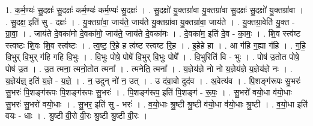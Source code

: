 \documentclass[17pt]{extarticle}
\begin{document}
1. क॒र्म॒ण्यः॑ सु॒दक्षः॑ सु॒दक्षः॑ कर्म॒ण्यः॑ कर्म॒ण्यः॑ सु॒दक्षः॑ । . सु॒दक्षो॑ यु॒क्तग्रा॑वा यु॒क्तग्रा॑वा सु॒दक्षः॑ सु॒दक्षो॑ यु॒क्तग्रा॑वा । . सु॒दक्ष॒ इति॑ सु - दक्षः॑ । . यु॒क्तग्रा॑वा॒ जाय॑ते॒ जाय॑ते यु॒क्तग्रा॑वा यु॒क्तग्रा॑वा॒ जाय॑ते । . यु॒क्तग्रा॒वेति॑ यु॒क्त - ग्रा॒वा॒ । . जाय॑ते दे॒वका॑मो दे॒वका॑मो॒ जाय॑ते॒ जाय॑ते दे॒वका॑मः । . दे॒वका॑म॒ इति॑ दे॒व - का॒मः॒ । . शि॒व स्त्व॑ष्ट स्त्वष्टः शि॒वः शि॒व स्त्व॑ष्टः । . त्व॒ष्ट॒ रि॒हे ह त्व॑ष्ट स्त्वष्ट रि॒ह । . इ॒हेहे हा । . आ ग॑हि ग॒ह्या ग॑हि । . ग॒हि॒ वि॒भुर् वि॒भुर् ग॑हि गहि वि॒भुः । . वि॒भुः पोषे॒ पोषे॑ वि॒भुर् वि॒भुः पोषे᳚ । . वि॒भुरिति॑ वि - भुः । . पोष॑ उ॒तोत पोषे॒ पोष॑ उ॒त । . उ॒त त्मना॒ त्मनो॒तोत त्मना᳚ । . त्मनेति॒ त्मना᳚ । . य॒ज्ञेय॑ज्ञे नो नो य॒ज्ञेय॑ज्ञे य॒ज्ञेय॑ज्ञे नः । . य॒ज्ञेय॑ज्ञ्॒ इति॑ य॒ज्ञे - य॒ज्ञे॒ । . न॒ उदुन् नो॑ न॒ उत् । . उ द॑वा॒वो दुद॑व । . अ॒वेत्य॑व । . पि॒शङ्ग॑रूपः सु॒भरः॑ सु॒भरः॑ पि॒शङ्ग॑रूपः पि॒शङ्ग॑रूपः सु॒भरः॑ । . पि॒शङ्ग॑रूप॒ इति॑ पि॒शङ्ग॑ - रू॒पः॒ । . सु॒भरो॑ वयो॒धा व॑यो॒धाः सु॒भरः॑ सु॒भरो॑ वयो॒धाः । . सु॒भर॒ इति॑ सु - भरः॑ । . व॒यो॒धाः श्रु॒ष्टी श्रु॒ष्टी व॑यो॒धा व॑यो॒धाः श्रु॒ष्टी । . व॒यो॒धा इति॑ वयः - धाः । . श्रु॒ष्टी वी॒रो वी॒रः श्रु॒ष्टी श्रु॒ष्टी वी॒रः । \newline
\end{document}
